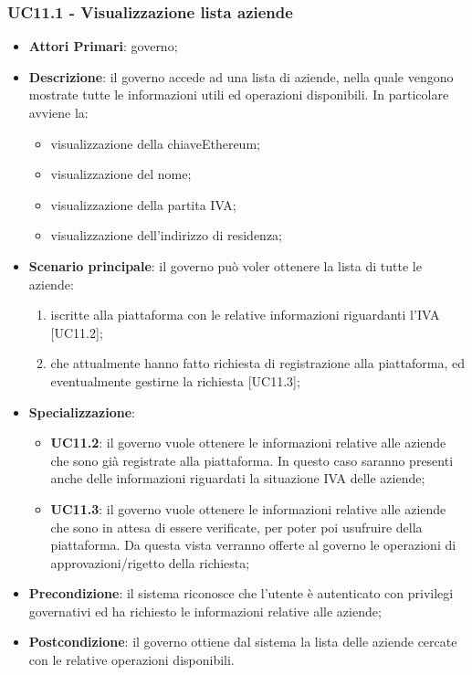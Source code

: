  \subsubsection{UC11.1 - Visualizzazione lista aziende}
 \begin{itemize}
 	\item \textbf{Attori Primari}: governo;
 	\item \textbf{Descrizione}: il governo accede ad una lista di aziende, nella quale vengono mostrate tutte le informazioni utili ed operazioni disponibili. In particolare avviene la:
 	\begin{itemize}
 		\item visualizzazione della chiave\glosp Ethereum;
 		\item visualizzazione del nome;
 		\item visualizzazione della partita IVA;
 		\item visualizzazione dell'indirizzo di residenza;
 	\end{itemize}
 	\item \textbf{Scenario principale}: il governo può voler ottenere la lista di tutte le aziende:
 	\begin{enumerate}[label=\alph*.]
 		\item iscritte alla piattaforma con le relative informazioni riguardanti l'IVA [UC11.2];
 		\item che attualmente hanno fatto richiesta di registrazione alla piattaforma, ed eventualmente gestirne la richiesta [UC11.3];
 	\end{enumerate}
	\item \textbf{Specializzazione}:
	\begin{itemize}
	 	\item \textbf{UC11.2}: il governo vuole ottenere le informazioni relative alle aziende che sono già registrate alla piattaforma. In questo caso saranno presenti anche delle informazioni riguardati la situazione IVA delle aziende;
	 	\item \textbf{UC11.3}: il governo vuole ottenere le informazioni relative alle aziende che sono in attesa di essere verificate, per poter poi usufruire della piattaforma. Da questa vista verranno offerte al governo le operazioni di approvazioni/rigetto della richiesta;
	\end{itemize}
 	\item \textbf{Precondizione}: il sistema riconosce che l'utente è autenticato con privilegi governativi ed ha richiesto le informazioni relative alle aziende;
 	\item \textbf{Postcondizione}: il governo ottiene dal sistema la lista delle aziende cercate con le relative operazioni disponibili.
\end{itemize}
